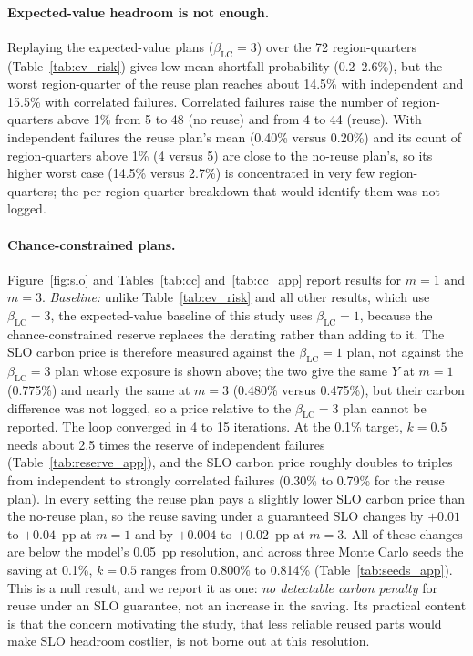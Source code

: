 \documentclass{article} %
\begin{document}
\paragraph{Expected-value headroom is not enough.} Replaying the expected-value plans ($\beta_{\text{LC}}=3$) over the 72 region-quarters (Table~\ref{tab:ev_risk}) gives low mean shortfall probability (0.2--2.6\%), but the worst region-quarter of the reuse plan reaches about 14.5\% with independent and 15.5\% with correlated failures. Correlated failures raise the number of region-quarters above 1\% from 5 to 48 (no reuse) and from 4 to 44 (reuse). With independent failures the reuse plan's mean (0.40\% versus 0.20\%) and its count of region-quarters above 1\% (4 versus 5) are close to the no-reuse plan's, so its higher worst case (14.5\% versus 2.7\%) is concentrated in very few region-quarters; the per-region-quarter breakdown that would identify them was not logged.

\paragraph{Chance-constrained plans.} Figure~\ref{fig:slo} and Tables~\ref{tab:cc} and~\ref{tab:cc_app} report results for $m=1$ and $m=3$. \emph{Baseline:} unlike Table~\ref{tab:ev_risk} and all other results, which use $\beta_{\text{LC}}=3$, the expected-value baseline of this study uses $\beta_{\text{LC}}=1$, because the chance-constrained reserve replaces the derating rather than adding to it. The SLO carbon price is therefore measured against the $\beta_{\text{LC}}=1$ plan, not against the $\beta_{\text{LC}}=3$ plan whose exposure is shown above; the two give the same $Y$ at $m=1$ (0.775\%) and nearly the same at $m=3$ (0.480\% versus 0.475\%), but their carbon difference was not logged, so a price relative to the $\beta_{\text{LC}}=3$ plan cannot be reported. The loop converged in 4 to 15 iterations. At the 0.1\% target, $k=0.5$ needs about 2.5 times the reserve of independent failures (Table~\ref{tab:reserve_app}), and the SLO carbon price roughly doubles to triples from independent to strongly correlated failures (0.30\% to 0.79\% for the reuse plan). In every setting the reuse plan pays a slightly lower SLO carbon price than the no-reuse plan, so the reuse saving under a guaranteed SLO changes by $+0.01$ to $+0.04$~pp at $m=1$ and by $+0.004$ to $+0.02$~pp at $m=3$. All of these changes are below the model's 0.05~pp resolution, and across three Monte Carlo seeds the saving at 0.1\%, $k=0.5$ ranges from 0.800\% to 0.814\% (Table~\ref{tab:seeds_app}). This is a null result, and we report it as one: \emph{no detectable carbon penalty} for reuse under an SLO guarantee, not an increase in the saving. Its practical content is that the concern motivating the study, that less reliable reused parts would make SLO headroom costlier, is not borne out at this resolution.
\end{document}
